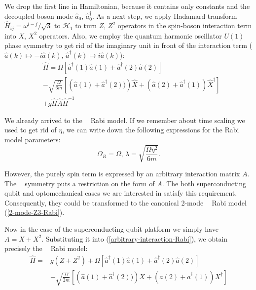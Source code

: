 \documentclass[reprint, aps, prx, amsmath, amssymb, longbibliography, superscriptaddress]{revtex4-2}
\DeclareMathOperator{\Zthree}{\mathbb{Z}_3}
\begin{document}
We drop the first line in Hamiltonian, because it contains only constants and the decoupled boson mode $\hat a_0, \, \hat a_0^{\dagger}$. As a next step, we apply Hadamard transform $\hat H_{ij} = \omega^{i-j}/\sqrt{3}$ to $\mathcal{H}_1$ to turn $ Z, \, Z^2$ operators in the spin-boson interaction term into  $ X, \, X^2$ operators. Also, we employ the quantum harmonic oscillator $U(1)$ phase symmetry to get rid of the imaginary unit in front of the interaction term ($\hat a(k) \mapsto -i \hat a(k), \, \hat a^{\dagger}(k) \mapsto i \hat a(k)$):
\begin{equation}
\label{arbitrary-interaction-Rabi}
\begin{aligned}
    &\hat H = \Omega \left[\hat a^{\dagger}(1) \hat a(1) + \hat a^{\dagger}(2) \hat a(2)\right] \\
    &- \sqrt{\frac{\Omega}{6 m}}\left[\left(\hat a(1) + \hat a^{\dagger}(2))\right)\hat X  + \left(\hat a(2) + \hat a^{\dagger}(1)\right)\hat X^{\dagger}  \right] \\
    &+ g \hat H \hat A \hat H^{-1}
\end{aligned}
\end{equation}

We already arrived to the $\Zthree$ Rabi model. If we remember about time scaling we used to get rid of $\eta$, we can write down the following expressions for the Rabi model parameters:
\begin{equation}
    \Omega_R = \Omega, \, \lambda = \sqrt{\frac{\Omega \eta^2}{6m}}.
\end{equation}

However, the purely spin term is expressed by an arbitrary interaction matrix $A$. The $\Zthree$ symmetry puts a restriction on the form of $ A$. The both superconducting qubit and optomechanical cases we are interested in satisfy this requirement. Consequently, they could be transformed to the canonical 2-mode $\Zthree$ Rabi model (\ref{2-mode-Z3-Rabi}).

Now in the case of the superconducting qubit platform we simply have $A = X + X^2$. Substituting it into (\ref{arbitrary-interaction-Rabi}),  we obtain precisely the $\Zthree$ Rabi model:
\begin{equation}
\begin{aligned}
    \hat H = &g (Z + Z^2) + \Omega \left[\hat a^{\dagger}(1) \hat a(1) + \hat a^{\dagger}(2) \hat a(2)\right] \\
    &- \sqrt{\frac{\Omega}{2 m}}\left[\left(\hat a(1) + \hat a^{\dagger}(2))\right)X  + \left(\hat a(2) + \hat a^{\dagger}(1)\right) X^{\dagger}  \right]
\end{aligned}
\end{equation}
\end{document}
